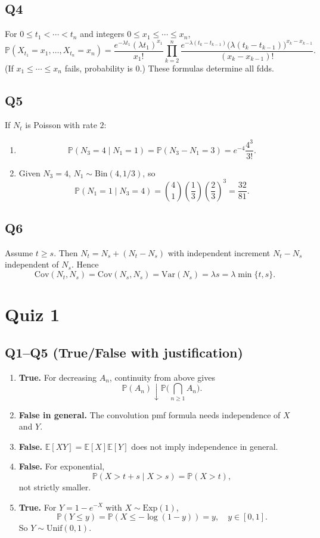 \documentclass[11pt]{article}
\newcommand{\PP}{\mathbb{P}}
\newcommand{\EE}{\mathbb{E}}
\newcommand{\1}{\mathbf{1}}
\begin{document}
\subsection*{Q4}
For $0\le t_1<\cdots<t_n$ and integers $0\le x_1\le\cdots\le x_n$,
\[
\PP(X_{t_1}=x_1,\dots,X_{t_n}=x_n)
=\frac{e^{-\lambda t_1}(\lambda t_1)^{x_1}}{x_1!}
\prod_{k=2}^n
\frac{e^{-\lambda(t_k-t_{k-1})}\big(\lambda(t_k-t_{k-1})\big)^{x_k-x_{k-1}}}{(x_k-x_{k-1})!}.
\]
(If $x_1\le\cdots\le x_n$ fails, probability is $0$.) These formulas determine all fdds.

\subsection*{Q5}
If $N_t$ is Poisson with rate $2$:
\begin{enumerate}[label=(\alph*)]
\item
\[
\PP(N_3=4\mid N_1=1)=\PP(N_3-N_1=3)=e^{-4}\frac{4^3}{3!}.
\]
\item Given $N_3=4$, $N_1\sim\mathrm{Bin}(4,1/3)$, so
\[
\PP(N_1=1\mid N_3=4)=\binom41\left(\frac13\right)\left(\frac23\right)^3=\frac{32}{81}.
\]
\end{enumerate}

\subsection*{Q6}
Assume $t\ge s$. Then $N_t=N_s+(N_t-N_s)$ with independent increment $N_t-N_s$ independent of $N_s$. Hence
\[
\mathrm{Cov}(N_t,N_s)=\mathrm{Cov}(N_s,N_s)=\mathrm{Var}(N_s)=\lambda s=\lambda\min\{t,s\}.
\]

\section{Quiz 1}

\subsection*{Q1--Q5 (True/False with justification)}
\begin{enumerate}
\item \textbf{True.} For decreasing $A_n$, continuity from above gives
\[
\PP(A_n)\downarrow\PP\Big(\bigcap_{n\ge1}A_n\Big).
\]
\item \textbf{False in general.} The convolution pmf formula needs independence of $X$ and $Y$.
\item \textbf{False.} $\EE[XY]=\EE[X]\EE[Y]$ does not imply independence in general.
\item \textbf{False.} For exponential,
\[
\PP(X>t+s\mid X>s)=\PP(X>t),
\]
not strictly smaller.
\item \textbf{True.} For $Y=1-e^{-X}$ with $X\sim\mathrm{Exp}(1)$,
\[
\PP(Y\le y)=\PP(X\le -\log(1-y))=y,\quad y\in[0,1].
\]
So $Y\sim\mathrm{Unif}(0,1)$.
\end{enumerate}
\end{document}
